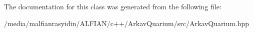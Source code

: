 The documentation for this class was generated from the following file\+:\begin{DoxyCompactItemize}
\item 
/media/malfianrasyidin/\+A\+L\+F\+I\+A\+N/c++/\+Arkav\+Quarium/src/Arkav\+Quarium.\+hpp\end{DoxyCompactItemize}
